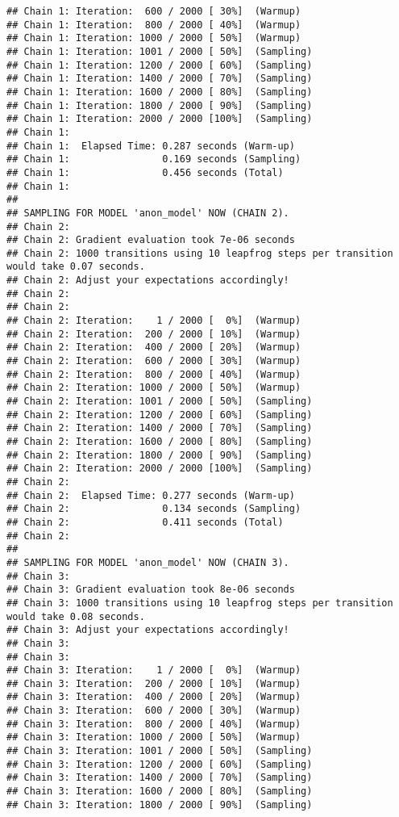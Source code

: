 \documentclass[
]{article}
\begin{document}
\begin{verbatim}
## Chain 1: Iteration:  600 / 2000 [ 30%]  (Warmup)
## Chain 1: Iteration:  800 / 2000 [ 40%]  (Warmup)
## Chain 1: Iteration: 1000 / 2000 [ 50%]  (Warmup)
## Chain 1: Iteration: 1001 / 2000 [ 50%]  (Sampling)
## Chain 1: Iteration: 1200 / 2000 [ 60%]  (Sampling)
## Chain 1: Iteration: 1400 / 2000 [ 70%]  (Sampling)
## Chain 1: Iteration: 1600 / 2000 [ 80%]  (Sampling)
## Chain 1: Iteration: 1800 / 2000 [ 90%]  (Sampling)
## Chain 1: Iteration: 2000 / 2000 [100%]  (Sampling)
## Chain 1: 
## Chain 1:  Elapsed Time: 0.287 seconds (Warm-up)
## Chain 1:                0.169 seconds (Sampling)
## Chain 1:                0.456 seconds (Total)
## Chain 1: 
## 
## SAMPLING FOR MODEL 'anon_model' NOW (CHAIN 2).
## Chain 2: 
## Chain 2: Gradient evaluation took 7e-06 seconds
## Chain 2: 1000 transitions using 10 leapfrog steps per transition would take 0.07 seconds.
## Chain 2: Adjust your expectations accordingly!
## Chain 2: 
## Chain 2: 
## Chain 2: Iteration:    1 / 2000 [  0%]  (Warmup)
## Chain 2: Iteration:  200 / 2000 [ 10%]  (Warmup)
## Chain 2: Iteration:  400 / 2000 [ 20%]  (Warmup)
## Chain 2: Iteration:  600 / 2000 [ 30%]  (Warmup)
## Chain 2: Iteration:  800 / 2000 [ 40%]  (Warmup)
## Chain 2: Iteration: 1000 / 2000 [ 50%]  (Warmup)
## Chain 2: Iteration: 1001 / 2000 [ 50%]  (Sampling)
## Chain 2: Iteration: 1200 / 2000 [ 60%]  (Sampling)
## Chain 2: Iteration: 1400 / 2000 [ 70%]  (Sampling)
## Chain 2: Iteration: 1600 / 2000 [ 80%]  (Sampling)
## Chain 2: Iteration: 1800 / 2000 [ 90%]  (Sampling)
## Chain 2: Iteration: 2000 / 2000 [100%]  (Sampling)
## Chain 2: 
## Chain 2:  Elapsed Time: 0.277 seconds (Warm-up)
## Chain 2:                0.134 seconds (Sampling)
## Chain 2:                0.411 seconds (Total)
## Chain 2: 
## 
## SAMPLING FOR MODEL 'anon_model' NOW (CHAIN 3).
## Chain 3: 
## Chain 3: Gradient evaluation took 8e-06 seconds
## Chain 3: 1000 transitions using 10 leapfrog steps per transition would take 0.08 seconds.
## Chain 3: Adjust your expectations accordingly!
## Chain 3: 
## Chain 3: 
## Chain 3: Iteration:    1 / 2000 [  0%]  (Warmup)
## Chain 3: Iteration:  200 / 2000 [ 10%]  (Warmup)
## Chain 3: Iteration:  400 / 2000 [ 20%]  (Warmup)
## Chain 3: Iteration:  600 / 2000 [ 30%]  (Warmup)
## Chain 3: Iteration:  800 / 2000 [ 40%]  (Warmup)
## Chain 3: Iteration: 1000 / 2000 [ 50%]  (Warmup)
## Chain 3: Iteration: 1001 / 2000 [ 50%]  (Sampling)
## Chain 3: Iteration: 1200 / 2000 [ 60%]  (Sampling)
## Chain 3: Iteration: 1400 / 2000 [ 70%]  (Sampling)
## Chain 3: Iteration: 1600 / 2000 [ 80%]  (Sampling)
## Chain 3: Iteration: 1800 / 2000 [ 90%]  (Sampling)

\end{verbatim}
\end{document}
